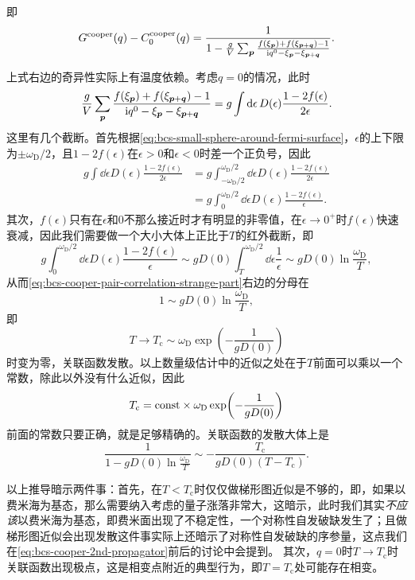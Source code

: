 即
\begin{equation}
    G^\text{cooper}(q) - C^\text{cooper}_0(q) = \frac{1}{1 - \frac{g}{V} \sum_{\vb*{p}} \frac{f(\xi_{\vb*{p}}) + f(\xi_{\vb*{p}+\vb*{q}}) - 1}{\mathrm{i} q^0 - \xi_{\vb*{p}} - \xi_{\vb*{p} + \vb*{q}}}}.
    \label{eq:bcs-cooper-pair-correlation-strange-part}
\end{equation}

上式右边的奇异性实际上有温度依赖。考虑$q=0$的情况，此时
\[
    \frac{g}{V} \sum_{\vb*{p}} \frac{f(\xi_{\vb*{p}}) + f(\xi_{\vb*{p}+\vb*{q}}) - 1}{\mathrm{i} q^0 - \xi_{\vb*{p}} - \xi_{\vb*{p} + \vb*{q}}} = g \int \dd{\epsilon} D(\epsilon) \frac{1 - 2f(\epsilon)}{2\epsilon}.
\]
这里有几个截断。首先根据\eqref{eq:bcs-small-sphere-around-fermi-surface}，$\epsilon$的上下限为$\pm \omega_\text{D} / 2$，且$1-2f(\epsilon)$在$\epsilon > 0$和$\epsilon < 0$时差一个正负号，因此
\[
    \begin{aligned}
        g \int \dd{\epsilon} D(\epsilon) \frac{1 - 2f(\epsilon)}{2\epsilon} &= g \int_{-\omega_\text{D}/2}^{\omega_\text{D}/2} \dd{\epsilon} D(\epsilon) \frac{1 - 2f(\epsilon)}{2\epsilon} \\
        &= g \int_{0}^{\omega_\text{D}/2} \dd{\epsilon} D(\epsilon) \frac{1 - 2f(\epsilon)}{\epsilon}.
    \end{aligned}
\]
其次，$f(\epsilon)$只有在$\epsilon$和$0$不那么接近时才有明显的非零值，在$\epsilon \to 0^+$时$f(\epsilon)$快速衰减，因此我们需要做一个大小大体上正比于$T$的红外截断，即
\[
    g \int_{0}^{\omega_\text{D}/2} \dd{\epsilon} D(\epsilon) \frac{1 - 2f(\epsilon)}{\epsilon} \sim g D(0) \int_{T}^{\omega_\text{D}/2} \dd{\epsilon} \frac{1}{\epsilon} \sim g D(0) \ln\frac{\omega_\text{D}}{T},
\]
从而\eqref{eq:bcs-cooper-pair-correlation-strange-part}右边的分母在
\[
    1 \sim g D(0) \ln\frac{\omega_\text{D}}{T},
\]
即
\begin{equation}
    T \to T_\text{c} \sim \omega_\text{D} \exp(- \frac{1}{g D(0)})
\end{equation}
时变为零，关联函数发散。以上数量级估计中的近似之处在于$T$前面可以乘以一个常数，除此以外没有什么近似，因此
\begin{equation}
    T_\text{c} = \mathrm{const} \times \omega_\text{D} \exp(- \frac{1}{g D(0)})
\end{equation}
前面的常数只要正确，就是足够精确的。关联函数的发散大体上是
\[
    \frac{1}{1 - g D(0) \ln \frac{\omega_\text{D}}{T}} \sim - \frac{T_\text{c}}{g D(0) (T - T_\text{c})}.
\]

以上推导暗示两件事：首先，在$T < T_\text{c}$时仅仅做梯形图近似是不够的，即，如果以费米海为基态，那么需要纳入考虑的量子涨落非常大，这暗示，此时我们其实\emph{不应该}以费米海为基态，即费米面出现了不稳定性，一个对称性自发破缺发生了；且做梯形图近似会出现发散这件事实际上还暗示了对称性自发破缺的序参量，这点我们在\eqref{eq:bcs-cooper-2nd-propagator}前后的讨论中会提到。
其次，$q=0$时$T \to T_\text{c}$时关联函数出现极点，这是相变点附近的典型行为，即$T = T_\text{c}$处可能存在相变。

